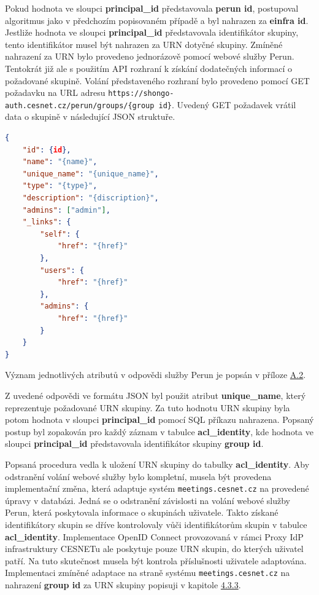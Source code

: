 \documentclass[
  printed, %
  twoside, %
  table,   %
  nolof,     %
  nolot,     %
]{fithesis3}
\begin{document}
\par 
Pokud hodnota ve sloupci \textbf{principal\_id} představovala \textbf{perun id}, postupoval algoritmus jako v předchozím popisovaném případě a byl nahrazen za \textbf{einfra id}. Jestliže hodnota ve sloupci \textbf{principal\_id} představovala identifikátor skupiny, tento identifikátor musel být nahrazen za URN  dotyčné skupiny. Zmíněné nahrazení za URN bylo provedeno jednorázově pomocí webové služby Perun. Tentokrát již ale s použitím API rozhraní k získání dodatečných informací o požadované skupině. Volání představeného rozhraní bylo provedeno pomocí GET požadavku na URL adresu  \texttt{https://shongo-auth.cesnet.cz/perun/groups/\{group id\}}. Uvedený GET požadavek vrátil data o skupině v následující JSON struktuře.   
\begin{lstlisting}[language=json,firstnumber=1]
{
    "id": {id},
    "name": "{name}",
    "unique_name": "{unique_name}",
    "type": "{type}",
    "description": "{discription}",
    "admins": ["admin"],
    "_links": {
        "self": {
            "href": "{href}"
        },
        "users": {
            "href": "{href}"
        },
        "admins": {
            "href": "{href}"
        }
    }
}
\end{lstlisting}
Význam jednotlivých atributů v odpovědi služby Perun je popsán v příloze \hyperref[table:perunws:group]{A.2}. 

\par

Z uvedené odpovědi ve formátu JSON byl použit atribut \textbf{unique\_name}, který reprezentuje požadované URN skupiny. Za tuto hodnotu URN skupiny byla potom hodnota v sloupci \textbf{principal\_id} pomocí SQL příkazu nahrazena. Popsaný postup byl zopakován pro každý záznam v tabulce \textbf{acl\_identity}, kde hodnota ve sloupci \textbf{principal\_id} představovala identifikátor skupiny \textbf{group id}. 
\par 

Popsaná procedura vedla k uložení URN skupiny do tabulky \textbf{acl\_identity}. Aby odstranění volání webové služby bylo kompletní, musela být provedena implementační změna, která adaptuje systém \texttt{meetings.cesnet.cz} na provedené úpravy v databázi. Jedná se o odstranění závislosti na volání webové služby Perun, která poskytovala informace o skupinách uživatele. Takto získané identifikátory skupin se dříve kontrolovaly vůči identifikátorům skupin v tabulce \textbf{acl\_identity}. Implementace OpenID Connect provozovaná v rámci Proxy IdP infrastruktury CESNETu ale poskytuje pouze URN skupin, do kterých uživatel patří. Na tuto skutečnost musela být kontrola příslušnosti uživatele adaptována. Implementaci zmíněné adaptace na straně systému \texttt{meetings.cesnet.cz} na nahrazení \textbf{group id} za URN skupiny popisuji v kapitole \hyperref[ShongoImpl-web]{4.3.3}. 
\end{document}
